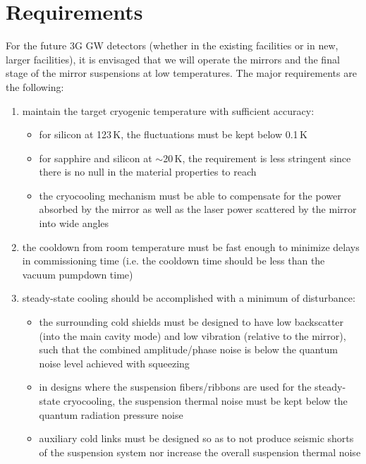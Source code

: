 \section{Requirements}
For the future 3G GW detectors (whether in the existing facilities or in new, larger facilities), it is envisaged that we will operate the mirrors and the final stage of the mirror suspensions at low temperatures.
The major requirements are the following:
\begin{enumerate}
\item maintain the target cryogenic temperature with sufficient accuracy:
      \begin{itemize}
        \item for silicon at 123\,K, the fluctuations must be kept below 0.1\,K
        \item for sapphire and silicon at $\sim$20\,K, the requirement is less stringent since there is no null in the material properties to reach
        \item the cryocooling mechanism must be able to compensate for the power absorbed by the mirror as well as the laser power scattered
        by the mirror into wide angles
      \end{itemize}

\item the cooldown from room temperature must be fast enough to minimize delays in commissioning time (i.e. the cooldown time should be less than the vacuum pumpdown time)

\item steady-state cooling should be accomplished with a minimum of disturbance:
      \begin{itemize}
        \item the surrounding cold shields must be designed to have low backscatter (into the main cavity mode) and low vibration (relative to the mirror), such that the combined amplitude/phase noise is below the quantum noise level achieved with squeezing
        \item in designs where the suspension fibers/ribbons are used for the steady-state cryocooling, the suspension thermal noise must be kept below the quantum radiation pressure noise
        \item auxiliary cold links must be designed so as to not produce seismic shorts of the suspension system nor increase the overall suspension thermal noise

      \end{itemize}
\end{enumerate}

